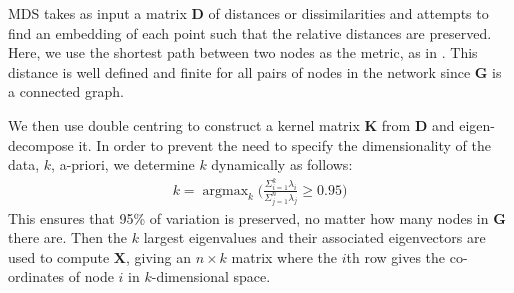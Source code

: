 \documentclass{article}
\DeclareMathOperator*{\argmax}{argmax}
\begin{document}
MDS takes as input a matrix $\textbf{D}$ of distances or dissimilarities and attempts to find an embedding of each point such that the relative distances are preserved. 
Here, we use the shortest path between two nodes as the metric, as in \cite{yamakawa2006self}. 
This distance is well defined and finite for all pairs of nodes in the network since $\textbf{G}$ is a connected graph. 




We then use double centring to construct a kernel matrix $\textbf{K}$ from $\textbf{D}$ and eigen-decompose it. 
In order to prevent the need to specify the dimensionality of the data, $k$, a-priori, we determine $k$ dynamically as follows:
\begin{align}
k = \argmax_k \Bigg(\frac{\Sigma_{i=1}^k \lambda_i}{\Sigma_{j=1}^n \lambda_j} \geq 0.95 \Bigg)
\end{align}
This ensures that 95\% of variation is preserved, no matter how many nodes in $\textbf{G}$ there are. 
Then the $k$ largest eigenvalues and their associated eigenvectors are used to compute $\textbf{X}$, giving an $n\times k$ matrix where the $i$th row gives the co-ordinates of node $i$ in $k$-dimensional space.
\end{document}
